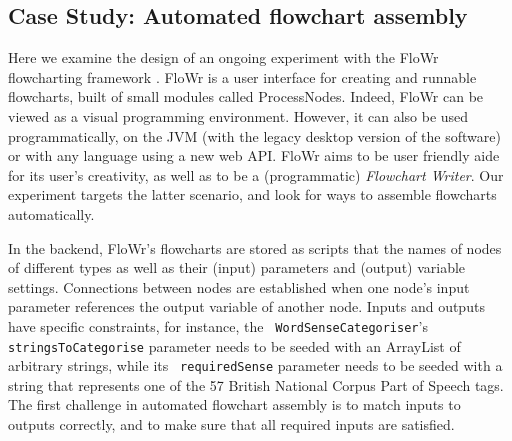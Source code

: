 \subsection{Case Study: Automated flowchart assembly}

Here we examine the design of an ongoing experiment with the FloWr
flowcharting framework \cite{colton-flowcharting}.  FloWr is a user
interface for creating and runnable flowcharts, built of small modules
called ProcessNodes.  Indeed, FloWr can be viewed as a visual
programming environment.  However, it can also be used
programmatically, on the JVM (with the legacy desktop version of the
software) or with any language using a new web API.  FloWr aims to be
user friendly aide for its user's creativity, as well as to be a
(programmatic) \emph{Flowchart Writer}.  Our experiment targets the
latter scenario, and look for ways to assemble flowcharts
automatically.

In the backend, FloWr's flowcharts are stored as scripts that the
names of nodes of different types as well as their (input) parameters
and (output) variable settings.  Connections between nodes are established
when one node's input parameter references the output variable of
another node.
Inputs and outputs have specific constraints, for instance, the {\tt
  WordSenseCategoriser}'s {\tt stringsToCategorise} parameter needs to
be seeded with an ArrayList of arbitrary strings, while its {\tt
  requiredSense} parameter needs to be seeded with a string that
represents one of the 57 British National Corpus Part of Speech tags.
The first challenge in automated flowchart assembly is to match inputs
to outputs correctly, and to make sure that all required inputs are
satisfied.

